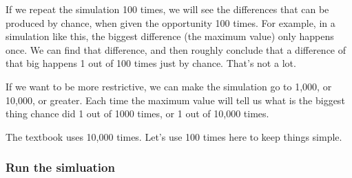 \documentclass[
]{book}
\begin{document}
If we repeat the simulation 100 times, we will see the differences that can be produced by chance, when given the opportunity 100 times. For example, in a simulation like this, the biggest difference (the maximum value) only happens once. We can find that difference, and then roughly conclude that a difference of that big happens 1 out of 100 times just by chance. That's not a lot.

If we want to be more restrictive, we can make the simulation go to 1,000, or 10,000, or greater. Each time the maximum value will tell us what is the biggest thing chance did 1 out of 1000 times, or 1 out of 10,000 times.

The textbook uses 10,000 times. Let's use 100 times here to keep things simple.

\hypertarget{run-the-simluation}{%
\subsubsection{Run the simluation}\label{run-the-simluation}}
\end{document}
